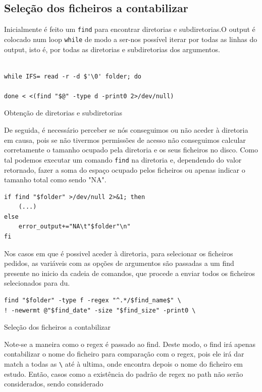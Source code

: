 \subsection{Seleção dos ficheiros a contabilizar}
Inicialmente é feito um \verb|find| para encontrar
diretorias e subdiretorias.O output é colocado num loop
\verb|while| de modo a ser-nos possível iterar por todas as
linhas do output, isto é, por todas as diretorias e
subdiretorias dos argumentos.
\begin{listing}[H]
\begin{verbatim}

while IFS= read -r -d $'\0' folder; do 

done < <(find "$@" -type d -print0 2>/dev/null)
\end{verbatim}
\caption{Obtenção de diretorias e subdiretorias}
\end{listing}
De seguida, é necessário perceber se nós conseguimos ou não
aceder à diretoria em causa, pois se não tivermos permissões
de acesso não conseguimos calcular corretamente o tamanho
ocupado pela diretoria e os seus ficheiros no disco. Como
tal podemos executar um comando \verb|find| na diretoria
e, dependendo do valor retornado, fazer a soma do espaço
ocupado pelos ficheiros ou apenas indicar o tamanho total
como sendo "NA".
\begin{listing}[H]
\begin{verbatim}
if find "$folder" >/dev/null 2>&1; then
    (...)
else
    error_output+="NA\t"$folder"\n"
fi
\end{verbatim}
\end{listing}
Nos casos em que é possivel aceder à diretoria, para
selecionar os ficheiros pedidos, as variáveis com as opções
de argumentos são passadas a um find presente no inicio da cadeia de comandos,
que procede a enviar todos os ficheiros selecionados para
du.
\begin{listing}[H]
\begin{verbatim}
find "$folder" -type f -regex "^.*/$find_name$" \
! -newermt @"$find_date" -size "$find_size" -print0 \
\end{verbatim}
\caption{Seleção dos ficheiros a contabilizar}
\end{listing}
Note-se a maneira como o regex é passado ao find. Deste
modo, o find irá apenas contabilizar o nome do ficheiro para
comparação com o regex, pois ele irá dar match a todas as
\verb|\| até à ultima, onde encontra depois o nome do
ficheiro em estudo. Então, casos como a existência do padrão
de regex no path não serão considerados, sendo considerado
